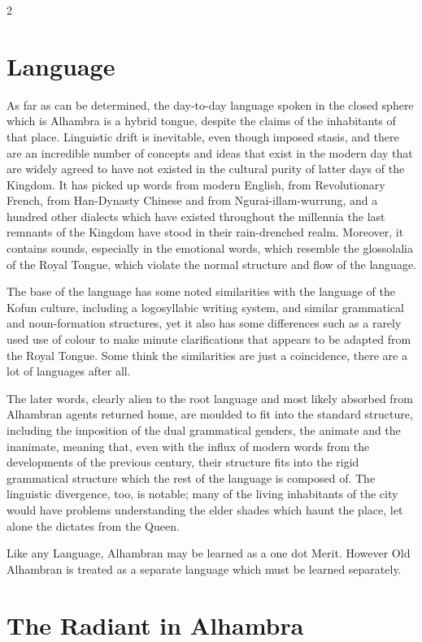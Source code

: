 \begin{multicols}{2}
\section*{Language}

As far as can be determined, the day-to-day language spoken in the closed sphere which is Alhambra is a hybrid tongue, despite the claims of the inhabitants of that place. Linguistic drift is inevitable, even though imposed stasis, and there are an incredible number of concepts and ideas that exist in the modern day that are widely agreed to have not existed in the cultural purity of latter days of the Kingdom. It has picked up words from modern English, from Revolutionary French, from Han-Dynasty Chinese and from Ngurai-illam-wurrung, and a hundred other dialects which have existed throughout the millennia the last remnants of the Kingdom have stood in their rain-drenched realm. Moreover, it contains sounds, especially in the emotional words, which resemble the glossolalia of the Royal Tongue, which violate the normal structure and flow of the language. 

The base of the language has some noted similarities with the language of the Kofun culture, including a logosyllabic writing system, and similar grammatical and noun-formation structures, yet it also has some differences such as a rarely used use of colour to make minute clarifications that appears to be adapted from the Royal Tongue. Some think the similarities are just a coincidence, there are a lot of languages after all. 

The later words, clearly alien to the root language and most likely absorbed from Alhambran agents returned home, are moulded to fit into the standard structure, including the imposition of the dual grammatical genders, the animate and the inanimate, meaning that, even with the influx of modern words from the developments of the previous century, their structure fits into the rigid grammatical structure which the rest of the language is composed of. The linguistic divergence, too, is notable; many of the living inhabitants of the city would have problems understanding the elder shades which haunt the place, let alone the dictates from the Queen. 

Like any Language, Alhambran may be learned as a one dot Merit. However Old Alhambran is treated as a separate language which must be learned separately.  

\section*{The Radiant in Alhambra}


\end{multicols}
